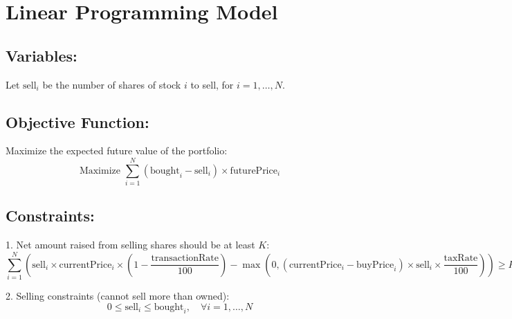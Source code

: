 \documentclass{article}
\begin{document}
\section*{Linear Programming Model}

\subsection*{Variables:}
Let \( \text{sell}_i \) be the number of shares of stock \( i \) to sell, for \( i = 1, \ldots, N \).

\subsection*{Objective Function:}
Maximize the expected future value of the portfolio:
\[
\text{Maximize } \sum_{i=1}^{N} (\text{bought}_i - \text{sell}_i) \times \text{futurePrice}_i
\]

\subsection*{Constraints:}
1. Net amount raised from selling shares should be at least \( K \):
\[
\sum_{i=1}^{N} \left( \text{sell}_i \times \text{currentPrice}_i \times \left(1 - \frac{\text{transactionRate}}{100}\right) - \max(0, (\text{currentPrice}_i - \text{buyPrice}_i) \times \text{sell}_i \times \frac{\text{taxRate}}{100}) \right) \geq K
\]

2. Selling constraints (cannot sell more than owned):
\[
0 \leq \text{sell}_i \leq \text{bought}_i, \quad \forall i = 1, \ldots, N
\]
\end{document}
